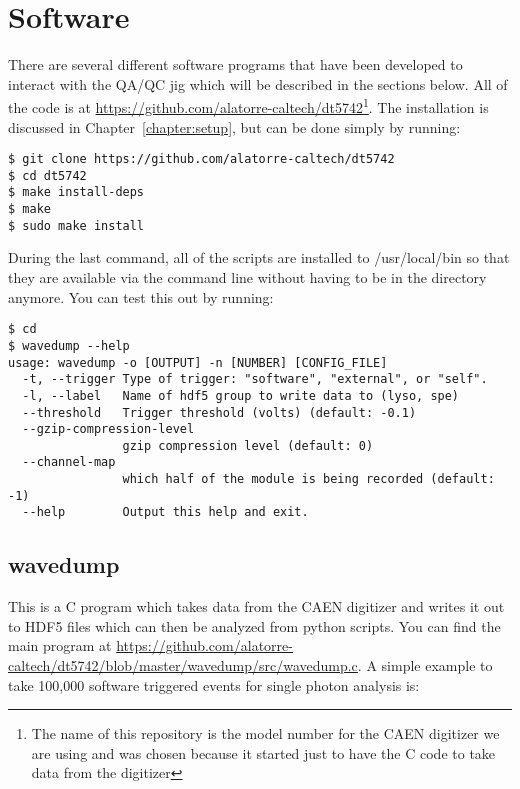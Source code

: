 \documentclass[12pt,openright,twoside]{report}
\begin{document}
\chapter{Software}

There are several different software programs that have been developed to
interact with the QA/QC jig which will be described in the sections below. All
of the code is at \url{https://github.com/alatorre-caltech/dt5742}\footnote{The
name of this repository is the model number for the CAEN digitizer we are using
and was chosen because it started just to have the C code to take data from the
digitizer}. The installation is discussed in Chapter~\ref{chapter:setup}, but can be done simply by running:

\begin{mdframed}[backgroundcolor=light-gray, roundcorner=10pt,leftmargin=1, rightmargin=1, innerleftmargin=15, innertopmargin=15,innerbottommargin=15, outerlinewidth=1, linecolor=light-gray]
\begin{lstlisting}
$ git clone https://github.com/alatorre-caltech/dt5742
$ cd dt5742
$ make install-deps
$ make
$ sudo make install
\end{lstlisting}
\end{mdframed}

During the last command, all of the scripts are installed to /usr/local/bin so
that they are available via the command line without having to be in the
directory anymore. You can test this out by running:

\begin{mdframed}[backgroundcolor=light-gray, roundcorner=10pt,leftmargin=1, rightmargin=1, innerleftmargin=15, innertopmargin=15,innerbottommargin=15, outerlinewidth=1, linecolor=light-gray]
\begin{lstlisting}
$ cd
$ wavedump --help
usage: wavedump -o [OUTPUT] -n [NUMBER] [CONFIG_FILE]
  -t, --trigger Type of trigger: "software", "external", or "self".
  -l, --label   Name of hdf5 group to write data to (lyso, spe)
  --threshold   Trigger threshold (volts) (default: -0.1)
  --gzip-compression-level
                gzip compression level (default: 0)
  --channel-map
                which half of the module is being recorded (default: -1)
  --help        Output this help and exit.
\end{lstlisting}
\end{mdframed}

\section{wavedump}
This is a C program which takes data from the CAEN digitizer and writes it out
to HDF5 files which can then be analyzed from python scripts. You can find the
main program at
\url{https://github.com/alatorre-caltech/dt5742/blob/master/wavedump/src/wavedump.c}.
A simple example to take 100,000 software triggered events for single photon
analysis is:
\end{document}
